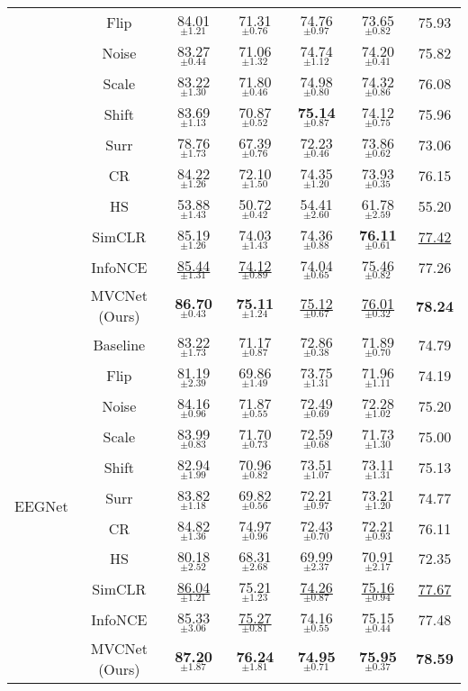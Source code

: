 \documentclass[journal]{IEEEtran}
\begin{document}
\begin{table*}[htpb]
\begin{tabular}{c|c|ccccc}
&Flip & 84.01$_{\pm1.21}$ & 71.31$_{\pm0.76}$ & 74.76$_{\pm0.97}$ & 73.65$_{\pm0.82}$ & 75.93 \\
&Noise & 83.27$_{\pm0.44}$ & 71.06$_{\pm1.32}$ & 74.74$_{\pm1.12}$ & 74.20$_{\pm0.41}$ & 75.82 \\
&Scale & 83.22$_{\pm1.30}$ & 71.80$_{\pm0.46}$ & 74.98$_{\pm0.80}$ & 74.32$_{\pm0.86}$ & 76.08 \\
&Shift & 83.69$_{\pm1.13}$ & 70.87$_{\pm0.52}$ & \textbf{75.14}$_{\pm0.87}$ & 74.12$_{\pm0.75}$ & 75.96 \\
&Surr & 78.76$_{\pm1.73}$ & 67.39$_{\pm0.76}$ & 72.23$_{\pm0.46}$ & 73.86$_{\pm0.62}$ & 73.06 \\
&CR & 84.22$_{\pm1.26}$ & 72.10$_{\pm1.50}$ & 74.35$_{\pm1.20}$ & 73.93$_{\pm0.35}$ & 76.15 \\
&HS & 53.88$_{\pm1.43}$ & 50.72$_{\pm0.42}$ & 54.41$_{\pm2.60}$ & 61.78$_{\pm2.59}$ & 55.20 \\
&SimCLR & 85.19$_{\pm1.26}$ & 74.03$_{\pm1.43}$ & 74.36$_{\pm0.88}$ & \textbf{76.11}$_{\pm0.61}$ & \underline{77.42} \\
&InfoNCE & \underline{85.44}$_{\pm1.31}$ & \underline{74.12}$_{\pm0.89}$ & 74.04$_{\pm0.65}$ & 75.46$_{\pm0.82}$ & 77.26 \\
&MVCNet (Ours) & \textbf{86.70}$_{\pm0.43}$ & \textbf{75.11}$_{\pm1.24}$ & \underline{75.12}$_{\pm0.67}$ & \underline{76.01}$_{\pm0.32}$ & \textbf{78.24} \\
\midrule
\multirow{11}{*}{EEGNet}
&Baseline & 83.22$_{\pm1.73}$ & 71.17$_{\pm0.87}$ & 72.86$_{\pm0.38}$  & 71.89$_{\pm0.70}$  & 74.79 \\
&Flip & 81.19$_{\pm2.39}$ & 69.86$_{\pm1.49}$ & 73.75$_{\pm1.31}$ & 71.96$_{\pm1.11}$ & 74.19 \\
&Noise & 84.16$_{\pm0.96}$ & 71.87$_{\pm0.55}$ & 72.49$_{\pm0.69}$ & 72.28$_{\pm1.02}$ & 75.20 \\
&Scale& 83.99$_{\pm0.83}$ & 71.70$_{\pm0.73}$ & 72.59$_{\pm0.68}$ & 71.73$_{\pm1.30}$ & 75.00 \\
&Shift & 82.94$_{\pm1.99}$ & 70.96$_{\pm0.82}$ & 73.51$_{\pm1.07}$ & 73.11$_{\pm1.31}$ & 75.13 \\
&Surr & 83.82$_{\pm1.18}$ & 69.82$_{\pm0.56}$ & 72.21$_{\pm0.97}$ & 73.21$_{\pm1.20}$ & 74.77 \\
&CR & 84.82$_{\pm1.36}$ & 74.97$_{\pm0.96}$ & 72.43$_{\pm0.70}$ & 72.21$_{\pm0.93}$ & 76.11 \\
&HS & 80.18$_{\pm2.52}$ & 68.31$_{\pm2.68}$ & 69.99$_{\pm2.37}$ & 70.91$_{\pm2.17}$ & 72.35 \\
&SimCLR &\underline{86.04}$_{\pm1.21}$ & 75.21$_{\pm1.23}$ & \underline{74.26}$_{\pm0.87}$ & \underline{75.16}$_{\pm0.94}$ & \underline{77.67}\\
&InfoNCE &85.33$_{\pm3.06}$ & \underline{75.27}$_{\pm0.81}$ & 74.16$_{\pm0.55}$ & 75.15$_{\pm0.44}$ & 77.48\\
&MVCNet (Ours) & \textbf{87.20}$_{\pm1.87}$ & \textbf{76.24}$_{\pm1.81}$ & \textbf{74.95}$_{\pm0.71}$ & \textbf{75.95}$_{\pm0.37}$ & \textbf{78.59}  \\
\bottomrule
\end{tabular}
\end{table*}
\end{document}
